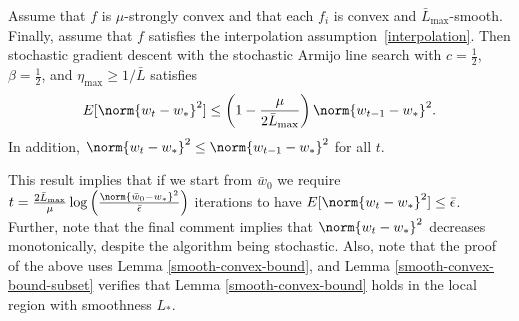 \documentclass[10pt]{article} %
\begin{document}
\begin{lemma}
    \label{lem:SGD}
    Assume that $f$ is $\mu$-strongly convex and that each $f_i$ is convex and $\bar{L}_{\text{max}}$-smooth. Finally, assume that $f$ satisfies the interpolation assumption~\eqref{interpolation}. Then stochastic gradient descent with the stochastic Armijo line search with $c = \frac{1}{2}$, $\beta =\frac{1}{2}$, and $\eta_\text{max} \geq 1/\bar{L}$ satisfies
    \begin{align*}
        E[\norm{w_t - w_*}^2] \leq \left(1 - \frac{\mu}{2\bar{L}_{\text{max}}} \right)\norm{w_{t-1} - w_*}^2.
    \end{align*}
    In addition, $\norm{w_{t} - w_*}^2 \leq \norm{w_{t-1} - w_*}^2$ for all $t$.
\end{lemma}
This result implies that if we start from $\bar{w}_0$ we require $t = \frac{2\bar{L}_{\text{max}}}{\mu}\log\left(\frac{\norm{\bar{w}_0 - w_*}^2}{\bar{\epsilon}}\right)$ iterations to have $E[\norm{w_t - w_*}^2] \leq \bar{\epsilon}$. Further, note that the final comment implies that $\norm{w_{t} - w_*}^2$ decreases monotonically, despite the algorithm being stochastic.
Also, note that the proof of the above uses Lemma \ref{smooth-convex-bound}, and Lemma \ref{smooth-convex-bound-subset} verifies that Lemma \ref{smooth-convex-bound} holds in the local region with smoothness $L_{*}$.
\end{document}
